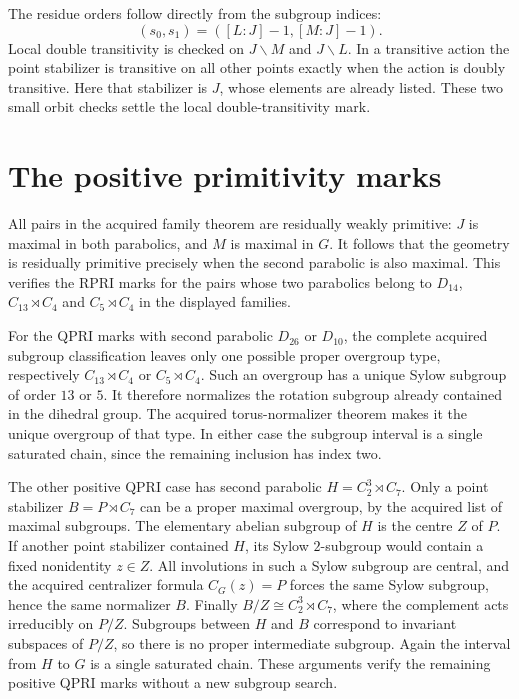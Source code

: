 \documentclass[11pt]{article}
\begin{document}
The residue orders follow directly from the subgroup indices:
\[
(s_0,s_1)=([L:J]-1,[M:J]-1).
\]
Local double transitivity is checked on $J\backslash M$ and
$J\backslash L$. In a transitive action the point stabilizer is transitive
on all other points exactly when the action is doubly transitive. Here
that stabilizer is $J$, whose elements are already listed. These two
small orbit checks settle the local double-transitivity mark.

\section{The positive primitivity marks}
All pairs in the acquired family theorem are residually weakly primitive:
$J$ is maximal in both parabolics, and $M$ is maximal in $G$. It follows
that the geometry is residually primitive precisely when the second
parabolic is also maximal. This verifies the RPRI marks for the pairs
whose two parabolics belong to $D_{14}$, $C_{13}\rtimes C_4$ and
$C_5\rtimes C_4$ in the displayed families.

For the QPRI marks with second parabolic $D_{26}$ or $D_{10}$, the complete
acquired subgroup classification leaves only one possible proper overgroup
type, respectively $C_{13}\rtimes C_4$ or $C_5\rtimes C_4$. Such an
overgroup has a unique Sylow subgroup of order $13$ or $5$. It therefore
normalizes the rotation subgroup already contained in the dihedral group.
The acquired torus-normalizer theorem makes it the unique overgroup of
that type. In either case the subgroup interval is a single saturated
chain, since the remaining inclusion has index two.

The other positive QPRI case has second parabolic $H=C_2^3\rtimes C_7$.
Only a point stabilizer $B=P\rtimes C_7$ can be a proper maximal overgroup,
by the acquired list of maximal subgroups. The elementary abelian subgroup
of $H$ is the centre $Z$ of $P$. If another point stabilizer contained $H$,
its Sylow $2$-subgroup would contain a fixed nonidentity $z\in Z$.
All involutions in such a Sylow subgroup are central, and the acquired
centralizer formula $C_G(z)=P$ forces the same Sylow subgroup, hence the
same normalizer $B$. Finally $B/Z\cong C_2^3\rtimes C_7$, where the
complement acts irreducibly on $P/Z$. Subgroups between $H$ and $B$
correspond to invariant subspaces of $P/Z$, so there is no proper
intermediate subgroup. Again the interval from $H$ to $G$ is a single
saturated chain. These arguments verify the remaining positive QPRI
marks without a new subgroup search.
\end{document}
